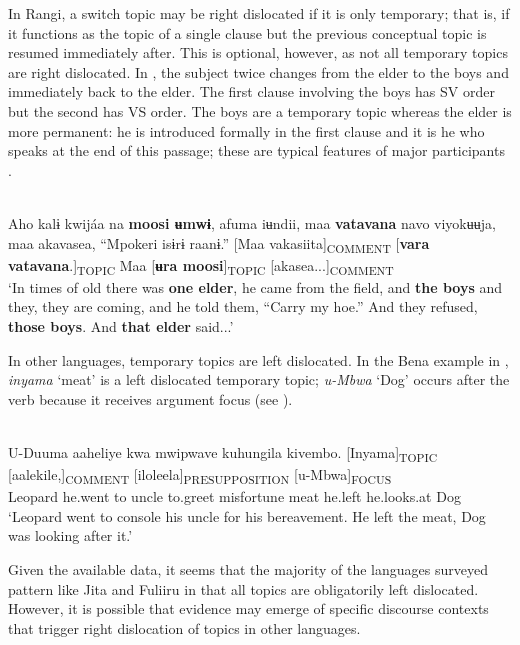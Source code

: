 \documentclass[output=paper]{langsci/langscibook}
\begin{document}
In Rangi, a switch topic may be right dislocated if it is only temporary; that is, if it functions as the topic of a single clause but the previous conceptual topic is resumed immediately after. This is optional, however, as not all temporary topics are right dislocated. In , the subject twice changes from the elder to the boys and immediately back to the elder. The first clause involving the boys has SV order but the second has VS order. The boys are a temporary topic whereas the elder is more permanent: he is introduced formally in the first clause and it is he who speaks at the end of this passage; these are typical features of major participants \citep[119]{dooleylevinsohn2001}.

\ea\label{ex:14.nicolle}
\\
Aho kalɨ kwijáa na \textbf{moosi ʉmwɨ}, afuma iʉndii, maa \textbf{vatavana} navo viyokʉʉja, maa akavasea, “Mpokeri isɨrɨ raanɨ.” [Maa vakasiita]\textsubscript{COMMENT} [\textbf{vara vatavana}.]\textsubscript{TOPIC} Maa [\textbf{ʉra moosi}]\textsubscript{TOPIC} [akasea...]\textsubscript{COMMENT}\\
\glt ‘In times of old there was \textbf{one elder}, he came from the field, and \textbf{the boys} and they, they are coming, and he told them, “Carry my hoe.” And they refused, \textbf{those boys}. And \textbf{that elder} said...’
\z

In other languages, temporary topics are left dislocated. In the Bena example in ,  \textit{inyama} ‘meat’ is a left dislocated temporary topic; \textit{u}\textit{-Mbwa} ‘Dog’ occurs after the verb because it receives argument focus (see ).

\ea\label{ex:15.nicolle}
\\
\gll U-Duuma aaheliye kwa mwipwave kuhungila kivembo. [Inyama]\textsubscript{TOPIC} [aalekile,]\textsubscript{COMMENT} [iloleela]\textsubscript{PRESUPPOSITION} [u-Mbwa]\textsubscript{FOCUS} \\
Leopard he.went to uncle to.greet misfortune {\db}meat {\db}he.left {\db}he.looks.at {\db}Dog\\
\glt ‘Leopard went to console his uncle for his bereavement. He left the meat, Dog was looking after it.’
\z

Given the available data, it seems that the majority of the languages surveyed pattern like Jita and Fuliiru in that all topics are obligatorily left dislocated. However, it is possible that evidence may emerge of specific discourse contexts that trigger right dislocation of topics in other languages.
\end{document}
